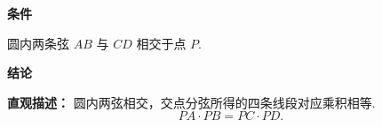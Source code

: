\begin{statementbox}

	\textbf{\textcolor{CStatement}{条件}}
	\begin{description}[style=nextline, leftmargin=2.8em, labelsep=0.5em, itemsep=0.35em]
		\item[\textbf{\textcolor{CStatement}{条件 1（两弦交点）：}}] 圆内两条弦 $AB$ 与 $CD$ 相交于点 $P$.
	\end{description}

	\textbf{\textcolor{CStatement}{结论}}
	\begin{description}[style=nextline, leftmargin=2.8em, labelsep=0.5em, itemsep=0.45em]
		\item[\textbf{\textcolor{CStatement}{结论一（相交弦定理）：}}]
			\textbf{\textcolor{CStatement}{直观描述：}}
			圆内两弦相交，交点分弦所得的四条线段对应乘积相等.
			\[
				PA \cdot PB = PC \cdot PD.
			\]

	\end{description}

\end{statementbox}
